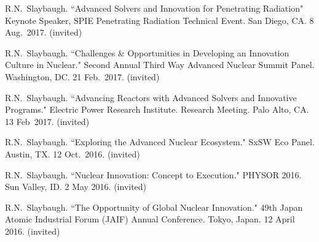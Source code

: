 \begin{bibsection}
\item R.N.\ Slaybaugh. ``Advanced Solvers and Innovation for Penetrating Radiation" Keynote Speaker, SPIE Penetrating Radiation Technical Event. San Diego, CA. 8 Aug.\ 2017. (invited)


\item R.N.\ Slaybaugh. ``Challenges \& Opportunities in Developing an Innovation Culture in Nuclear." Second Annual Third Way Advanced Nuclear Summit Panel. Washington, DC. 21 Feb.\ 2017. (invited)

\item R.N.\ Slaybaugh. ``Advancing Reactors with Advanced Solvers and Innovative Programs." Electric Power Research Institute. Research Meeting. Palo Alto, CA. 13 Feb\ 2017. (invited)

\item R.N.\ Slaybaugh. ``Exploring the Advanced Nuclear Ecosystem." SxSW Eco Panel. Austin, TX. 12 Oct.\ 2016. (invited)




\item R.N.\ Slaybaugh. ``Nuclear Innovation: Concept to Execution." PHYSOR 2016. Sun Valley, ID. 2 May 2016. (invited)


\item R.N.\ Slaybaugh. ``The Opportunity of Global Nuclear Innovation." 49th Japan Atomic Industrial Forum (JAIF) Annual Conference. Tokyo, Japan. 12 April 2016. (invited)


\end{bibsection}
